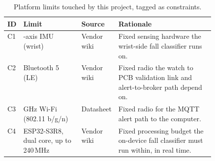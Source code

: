 
\begin{table}[!ht]
\centering
\scriptsize
\renewcommand{\arraystretch}{0.85}
\setlength{\tabcolsep}{3pt}
\caption{Platform limits touched by this project, tagged as constraints.}
\label{tab:platform}
\begin{tabularx}{\linewidth}{
  @{}>{\raggedright\arraybackslash}p{0.06\linewidth}
    >{\raggedright\arraybackslash}p{0.28\linewidth}
    >{\raggedright\arraybackslash}p{0.15\linewidth}
    >{\raggedright\arraybackslash}X@{}}
\toprule
ID & Limit & Source & Rationale \\
\midrule
C1 & 6-axis IMU (wrist) & Vendor wiki & Fixed sensing hardware the wrist-side fall classifier runs on. \\
\addlinespace
C2 & Bluetooth 5 (LE) & Vendor wiki & Fixed radio the watch to PCB validation link and alert-to-broker path depend on. \\
\addlinespace
C3 & 2.4 GHz Wi-Fi (802.11 b/g/n) & Datasheet & Fixed radio for the MQTT alert path to the computer. \\
\addlinespace
C4 & ESP32-S3R8, dual core, up to 240\,MHz & Vendor wiki & Fixed processing budget the on-device fall classifier must run within, in real time. \\
\bottomrule
\end{tabularx}
\end{table}